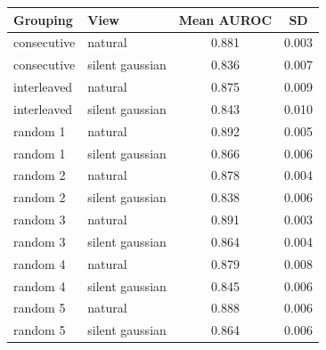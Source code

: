 \begin{tabular}{llcc}
\toprule
Grouping & View & Mean AUROC & SD \\
\midrule
consecutive & natural & 0.881 & 0.003 \\
consecutive & silent gaussian & 0.836 & 0.007 \\
interleaved & natural & 0.875 & 0.009 \\
interleaved & silent gaussian & 0.843 & 0.010 \\
random 1 & natural & 0.892 & 0.005 \\
random 1 & silent gaussian & 0.866 & 0.006 \\
random 2 & natural & 0.878 & 0.004 \\
random 2 & silent gaussian & 0.838 & 0.006 \\
random 3 & natural & 0.891 & 0.003 \\
random 3 & silent gaussian & 0.864 & 0.004 \\
random 4 & natural & 0.879 & 0.008 \\
random 4 & silent gaussian & 0.845 & 0.006 \\
random 5 & natural & 0.888 & 0.006 \\
random 5 & silent gaussian & 0.864 & 0.006 \\
\bottomrule
\end{tabular}
